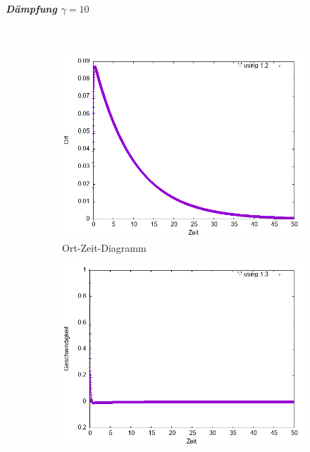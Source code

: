 \documentclass[
    oneside,
    ngerman,
    footinclude=false,
    captions=tableheading,
    DIV=12
]{scrartcl}
\begin{document}
               \subparagraph{Dämpfung $\gamma=10$}\,
               \begin{figure}[H]
                   \centering
                   \begin{subfigure}[b]{0.45\textwidth}
                       \centering
                       \includegraphics[width=\textwidth]{Bilddateien/VVA1(b)-001-10-x.png}
                       \caption{Ort-Zeit-Diagramm}
                       \label{fig:VVA1(a)-001-10-x}
                   \end{subfigure}
                   \hfill
                   \begin{subfigure}[b]{0.45\textwidth}
                       \centering
                       \includegraphics[width=\textwidth]{Bilddateien/VVA1(b)-001-10-v.png}

\end{subfigure}
\end{figure}
\end{document}
